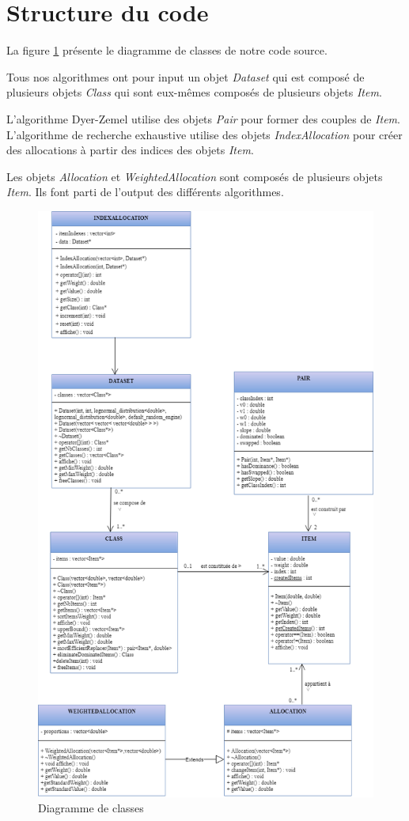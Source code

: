 \documentclass{article}
\begin{document}
\newpage
\section{Structure du code}

La figure \ref{fig:diagramme} présente le diagramme de classes de notre code source.

Tous nos algorithmes ont pour input un objet \textit{Dataset} qui est composé de plusieurs objets \textit{Class} qui sont eux-mêmes composés de plusieurs objets \textit{Item}.

L'algorithme Dyer-Zemel utilise des objets \textit{Pair} pour former des couples de \textit{Item}.
L'algorithme de recherche exhaustive utilise des objets \textit{IndexAllocation} pour créer des allocations à partir des indices des objets \textit{Item}.

Les objets \textit{Allocation} et \textit{WeightedAllocation} sont composés de plusieurs objets \textit{Item}. Ils font parti de l'output des différents algorithmes.

\begin{figure}[!ht]
	\centering
	\includegraphics[width=12cm]{KnapsackClasses.png}
	\caption{Diagramme de classes}
	\label{fig:diagramme}
\end{figure}
\end{document}
